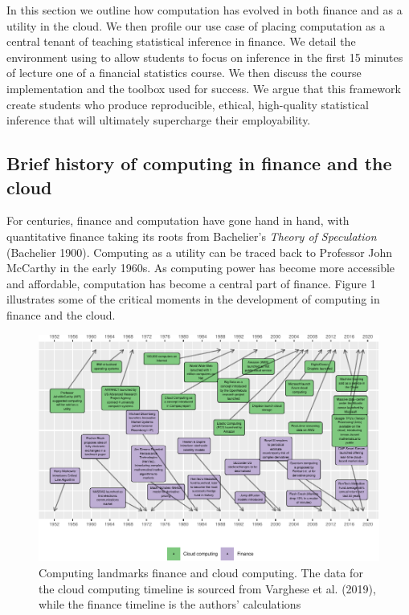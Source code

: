 \documentclass{article}
\begin{document}
In this section we outline how computation has evolved in both finance
and as a utility in the cloud. We then profile our use case of placing
computation as a central tenant of teaching statistical inference in
finance. We detail the environment using to allow students to focus on
inference in the first 15 minutes of lecture one of a financial
statistics course. We then discuss the course implementation and the
toolbox used for success. We argue that this framework create students
who produce reproducible, ethical, high-quality statistical inference
that will ultimately supercharge their employability.

\hypertarget{brief-history-of-computing-in-finance-and-the-cloud}{%
\subsection{Brief history of computing in finance and the
cloud}\label{brief-history-of-computing-in-finance-and-the-cloud}}

For centuries, finance and computation have gone hand in hand, with
quantitative finance taking its roots from Bachelier's \emph{Theory of
Speculation} (Bachelier 1900). Computing as a utility can be traced back
to Professor John McCarthy in the early 1960s. As computing power has
become more accessible and affordable, computation has become a central
part of finance. Figure 1 illustrates some of the critical moments in
the development of computing in finance and the cloud.

\begin{figure}

{\centering \includegraphics[width=1\linewidth]{qrap_paper_files/figure-latex/timeline-1} 

}

\caption{ Computing landmarks finance and cloud computing.   The data for the cloud computing timeline is sourced from Varghese et al. (2019), while the finance timeline is the authors' calculations}\label{fig:timeline}
\end{figure}
\end{document}
